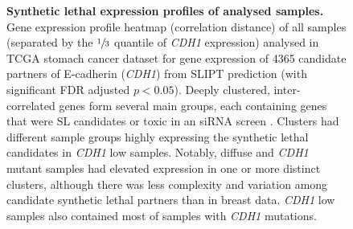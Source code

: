 \begin{figure}[!ht]
  \centering
    \caption[Synthetic lethal expression profiles of stomach samples]{\small \textbf{Synthetic lethal expression profiles of analysed samples.} Gene expression profile heatmap (correlation distance) of all samples (separated by the $\sfrac{1}{3}$ quantile of \textit{CDH1} expression) analysed in \gls{TCGA} stomach cancer dataset for gene expression of 4365 candidate partners of \gls{E-cadherin} (\textit{CDH1}) from \gls{SLIPT} prediction (with significant \gls{FDR} adjusted $p < 0.05$). Deeply clustered, inter-correlated genes form several main groups, each containing genes that were SL candidates or toxic in an \gls{siRNA} screen \cite{Telford2015}. Clusters had different sample groups highly expressing the synthetic lethal candidates in \textit{CDH1} low samples. Notably, diffuse and \textit{CDH1} mutant samples had elevated expression in one or more distinct clusters, although there was less complexity and variation among candidate synthetic lethal partners than in breast data. \textit{CDH1} low samples also contained most of samples with \textit{CDH1} mutations.
}
\label{fig:slipt_expr_stad}
\end{figure}


